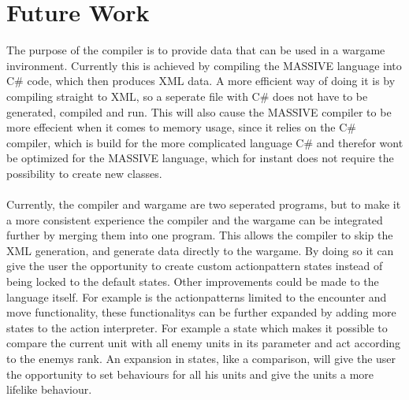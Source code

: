 \chapter{Future Work}
The purpose of the compiler is to provide data that can be used in a wargame invironment. 
Currently this is achieved by compiling the MASSIVE language into C\# code, which then produces XML data. 
A more efficient way of doing it is by compiling straight to XML, so a seperate file with C\# does not have to be generated, compiled and run. 
This will also cause the MASSIVE compiler to be more effecient when it comes to memory usage, since it relies on the C\# compiler, which is build for the more complicated language C\# and therefor wont be optimized for the MASSIVE language, which for instant does not require the possibility to create new classes.\\
\\
Currently, the compiler and wargame are two seperated programs, but to make it a more consistent experience the compiler and the wargame can be integrated further by merging them into one program.
This allows the compiler to skip the XML generation, and generate data directly to the wargame. By doing so it can give the user the opportunity to create custom actionpattern states instead of being locked to the default states.\newline
Other improvements could be made to the language itself.
For example is the actionpatterns limited to the encounter and move functionality, these functionalitys can be further expanded by adding more states to the action interpreter. 
For example a state which makes it possible to compare the current unit with all enemy units in its parameter and act according to the enemys rank.
An expansion in states, like a comparison, will give the user the opportunity to set behaviours for all his units and give the units a more lifelike behaviour.\\
\\
